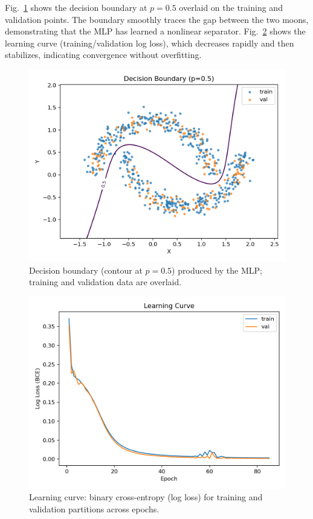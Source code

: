 \documentclass[journal]{IEEEtran}
\begin{document}
Fig.~\ref{fig:boundary} shows the decision boundary at $p{=}0.5$ overlaid on the training and validation points. The boundary smoothly traces the gap between the two moons, demonstrating that the MLP has learned a nonlinear separator. Fig.~\ref{fig:curve} shows the learning curve (training/validation log loss), which decreases rapidly and then stabilizes, indicating convergence without overfitting.

\begin{figure}[!t]
\centering
\includegraphics[width=\columnwidth]{decision_boundary.png}
\caption{Decision boundary (contour at $p{=}0.5$) produced by the MLP; training and validation data are overlaid.}
\label{fig:boundary}
\end{figure}

\begin{figure}[!t]
\centering
\includegraphics[width=\columnwidth]{learning_curve.png}
\caption{Learning curve: binary cross-entropy (log loss) for training and validation partitions across epochs.}
\label{fig:curve}
\end{figure}
\end{document}
